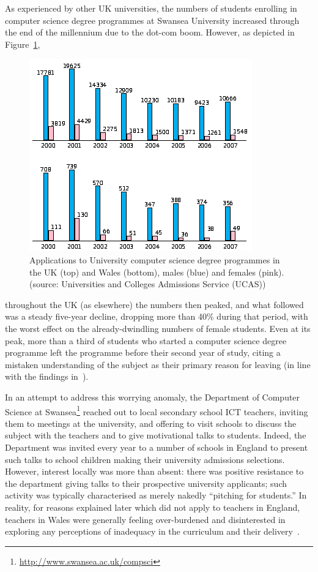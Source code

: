 \documentclass{sig-alternate}
\begin{document}
As experienced by other UK universities, the numbers of students
enrolling in computer science degree programmes at Swansea University
increased through the end of the millennium due to the dot-com boom.
However, as depicted in Figure~\ref{fig:numbers},
\begin{figure}%
  \centering
  \includegraphics[width=0.9\columnwidth]{images/numbers.png}
  \caption{Applications to University computer science degree programmes
           in the UK (top) and Wales (bottom), males (blue) and females (pink).
           (source: Universities and Colleges Admissions Service
           (UCAS))}
  \label{fig:numbers}
\end{figure}
throughout the UK
(as elsewhere) the numbers then peaked, and what followed was a steady
five-year decline, dropping more than 40\% during that period, with
the worst effect on the already-dwindling numbers of female students.
Even at its peak, more than a third of students who started a computer
science degree programme left the programme before their second year
of study, citing a mistaken understanding of the subject as their
primary reason for leaving
(in line with the findings in~\cite{brown-et-al-toce2014}).

In an attempt to address this worrying anomaly, the Department of
Computer Science at
Swansea\footnote{\url{http://www.swansea.ac.uk/compsci}} reached out
to local secondary school ICT teachers, inviting them to meetings at
the university, and offering to visit schools to discuss the subject
with the teachers and to give motivational talks to students. Indeed,
the Department was invited every year to a number of schools in
England to present such talks to school children making their
university admissions selections.  However, interest locally was more
than absent: there was positive resistance to the department giving
talks to their prospective university applicants; such activity was
typically characterised as merely nakedly ``pitching for students.''
In reality, for reasons explained later which did not apply to
teachers in England, teachers in Wales were generally feeling
over-burdened and disinterested in exploring any perceptions of
inadequacy in the curriculum and their
delivery~\cite{crick+sentance:2011,boyle-et-al:2012,brown-et-al-toce2014,crick+moller-wipsce2015}.
\end{document}
